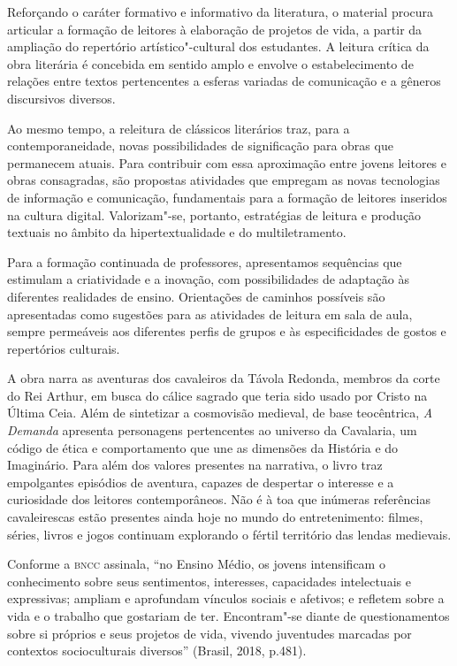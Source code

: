 \documentclass{extarticle}
\begin{document}
Reforçando o caráter formativo e informativo da literatura, o material
procura articular a formação de leitores à elaboração de projetos de
vida, a partir da ampliação do repertório artístico"-cultural dos
estudantes. A leitura crítica da obra literária é concebida em sentido
amplo e envolve o estabelecimento de relações entre textos pertencentes
a esferas variadas de comunicação e a gêneros discursivos diversos.

Ao mesmo tempo, a releitura de clássicos literários traz, para a
contemporaneidade, novas possibilidades de significação para obras que
permanecem atuais. Para contribuir com essa aproximação entre jovens
leitores e obras consagradas, são propostas atividades que empregam as
novas tecnologias de informação e comunicação, fundamentais para a
formação de leitores inseridos na cultura digital. Valorizam"-se,
portanto, estratégias de leitura e produção textuais no âmbito da
hipertextualidade e do multiletramento.

Para a formação continuada de professores, apresentamos sequências que
estimulam a criatividade e a inovação, com possibilidades de adaptação
às diferentes realidades de ensino. Orientações de caminhos possíveis
são apresentadas como sugestões para as atividades de leitura em sala de
aula, sempre permeáveis aos diferentes perfis de grupos e às
especificidades de gostos e repertórios culturais.

A obra narra as aventuras dos cavaleiros da Távola Redonda, membros da
corte do Rei Arthur, em busca do cálice sagrado que teria sido usado por
Cristo na Última Ceia. Além de sintetizar a cosmovisão medieval, de base
teocêntrica, \emph{A Demanda} apresenta personagens pertencentes ao
universo da Cavalaria, um código de ética e comportamento que une as
dimensões da História e do Imaginário. Para além dos valores presentes
na narrativa, o livro traz empolgantes episódios de aventura, capazes de
despertar o interesse e a curiosidade dos leitores contemporâneos. Não é
à toa que inúmeras referências cavaleirescas estão presentes ainda hoje
no mundo do entretenimento: filmes, séries, livros e jogos continuam
explorando o fértil território das lendas medievais.

Conforme a \textsc{bncc} assinala, ``no Ensino Médio, os jovens intensificam o
conhecimento sobre seus sentimentos, interesses, capacidades
intelectuais e expressivas; ampliam e aprofundam vínculos sociais e
afetivos; e refletem sobre a vida e o trabalho que gostariam de ter.
Encontram"-se diante de questionamentos sobre si próprios e seus projetos
de vida, vivendo juventudes marcadas por contextos socioculturais
diversos'' (Brasil, 2018, p.481).
\end{document}
